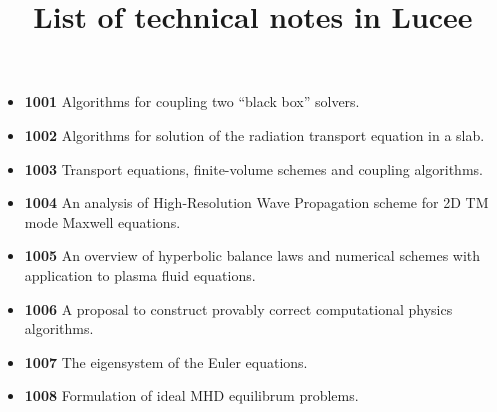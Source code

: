\documentclass[11pt]{article}
\title{List of technical notes in Lucee}
\author{}
\date{}
\begin{document}
\maketitle

\begin{itemize}
  \item {\bf 1001} Algorithms for coupling two ``black box'' solvers.
  \item {\bf 1002} Algorithms for solution of the radiation transport
    equation in a slab.
  \item {\bf 1003} Transport equations, finite-volume schemes and
    coupling algorithms.
  \item {\bf 1004} An analysis of High-Resolution Wave Propagation
    scheme for 2D TM mode Maxwell equations.
  \item {\bf 1005} An overview of hyperbolic balance laws and
    numerical schemes with application to plasma fluid equations.
  \item {\bf 1006} A proposal to construct provably correct
    computational physics algorithms.
  \item {\bf 1007} The eigensystem of the Euler equations.
  \item {\bf 1008} Formulation of ideal MHD equilibrum problems.
\end{itemize}
\end{document}
